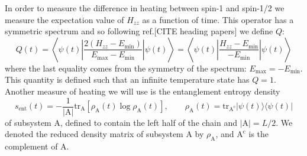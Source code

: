 \documentclass{SciPost}
\newcommand\0{\scalebox{-1}[1]{0}}
\begin{document}
In order to measure the difference in heating between spin-1 and spin-1/2 we measure the expectation value of $H_{zz}$ as a function of time. This operator has a symmetric spectrum and so following ref.[CITE heading papers] we define $Q$:
\begin{equation}
Q(t) =\left\langle\psi(t)\left\vert\frac{ 2\left(H_{zz}-E_\mathrm{min}\right)}{E_\mathrm{max}-E_\mathrm{min}}\right\vert\psi(t)\right\rangle=\left\langle\psi(t)\left\vert\frac{ H_{zz}-E_\mathrm{min}}{-E_\mathrm{min}}\right\vert\psi(t)\right\rangle
\end{equation}
where the last equality comes from the symmetry of the spectrum: $E_\mathrm{max}=-E_\mathrm{min}$. This quantity is defined such that an infinite temperature state has $Q=1$. Another measure of heating we will use is the entanglement entropy density
\begin{equation}
s_\mathrm{ent}(t) = -\frac{1}{|\mathrm{A}|}\mathrm{tr}_{\mathrm{A}}\left[\rho_\mathrm{A}(t)\log\rho_\mathrm{A}(t)\right], \qquad \rho_\mathrm{A}(t) = \mathrm{tr}_{\mathrm{A^c}} |\psi(t)\rangle\langle\psi(t)|
\end{equation}
of subsystem A, defined to contain the left half of the chain and $|\mathrm{A}|=L/2$. We denoted the reduced density matrix of subsystem A by $\rho_\mathrm{A}$, and $\mathrm{A^c}$ is the complement of A. 
\end{document}
